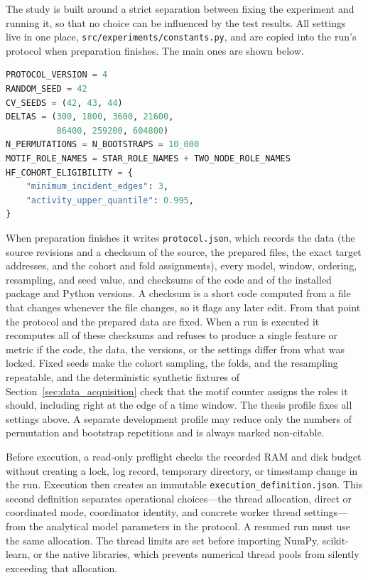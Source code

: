 \documentclass{thesisclass}
\begin{document}
The study is built around a strict separation between fixing the experiment and
running it, so that no choice can be influenced by the test results. All settings live
in one place, \texttt{src/experiments/constants.py}, and are copied into the run's
protocol when preparation finishes. The main ones are shown below.

\begin{lstlisting}[language=Python,
  caption={Selected locked experiment constants.},
  label={lst:config}]
PROTOCOL_VERSION = 4
RANDOM_SEED = 42
CV_SEEDS = (42, 43, 44)
DELTAS = (300, 1800, 3600, 21600,
          86400, 259200, 604800)
N_PERMUTATIONS = N_BOOTSTRAPS = 10_000
MOTIF_ROLE_NAMES = STAR_ROLE_NAMES + TWO_NODE_ROLE_NAMES
HF_COHORT_ELIGIBILITY = {
    "minimum_incident_edges": 3,
    "activity_upper_quantile": 0.995,
}
\end{lstlisting}

When preparation finishes it writes \texttt{protocol.json}, which records the data
(the source revisions and a checksum of the source, the prepared files, the exact
target addresses, and the cohort and fold assignments), every model, window,
ordering, resampling, and seed value, and checksums of the code and of the
installed package and Python versions. A checksum is a short code computed from a
file that changes whenever the file changes, so it flags any later edit. From that
point the protocol and the prepared data are fixed. When a run is executed it
recomputes all of these checksums and refuses to produce a single feature or metric
if the code, the data, the versions, or the settings differ from what was locked. Fixed seeds make
the cohort sampling, the folds, and the resampling repeatable, and the
deterministic synthetic fixtures of Section~\ref{sec:data_acquisition} check that
the motif counter assigns the roles it should, including right at the edge of a
time window. The thesis profile fixes all settings above. A separate development
profile may reduce only the numbers of permutation and bootstrap repetitions and
is always marked non-citable.

Before execution, a read-only preflight checks the recorded RAM and disk budget
without creating a lock, log record, temporary directory, or timestamp change in
the run. Execution then creates an immutable
\texttt{execution\_definition.json}. This second definition separates operational
choices---the thread allocation, direct or coordinated mode, coordinator
identity, and concrete worker thread settings---from the analytical model
parameters in the protocol. A resumed run must use the same allocation. The
thread limits are set before importing NumPy, scikit-learn, or the native
libraries, which prevents numerical thread pools from silently exceeding that
allocation.
\end{document}

